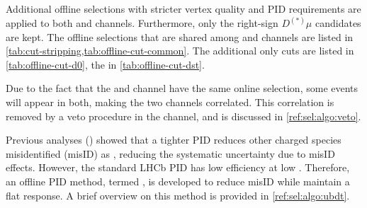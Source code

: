 Additional offline selections with stricter vertex quality and PID requirements
are applied to both \Dz and \Dstar channels.
Furthermore, only the right-sign $D^{(*)}\mu$ candidates are kept.
The offline selections that are shared among \Dz and \Dstar channels are listed
in \cref{tab:cut-stripping,tab:offline-cut-common}.
The additional \Dz only cuts are listed in \cref{tab:offline-cut-d0},
the \Dstar in \cref{tab:offline-cut-dst}.

Due to the fact that the \Dz and \Dstar channel have the same online selection,
some events will appear in both,
making the two channels correlated.
This correlation is removed by a \Dstar veto procedure in the \Dz channel,
and is discussed in \cref{ref:sel:algo:veto}.

Previous analyses (\cite{PhysRevLett.115.111803,LHCb-ANA-2020-056})
showed that a tighter \muon PID reduces other charged species misidentified
(misID) as \muon, reducing the systematic uncertainty due to misID effects.
However, the standard LHCb \muon PID has low efficiency at low \pt.
Therefore, an offline \muon PID method, termed \UBDT, is developed to reduce
misID while maintain a flat \pt response.
A brief overview on this method is provided in \cref{ref:sel:algo:ubdt}.


